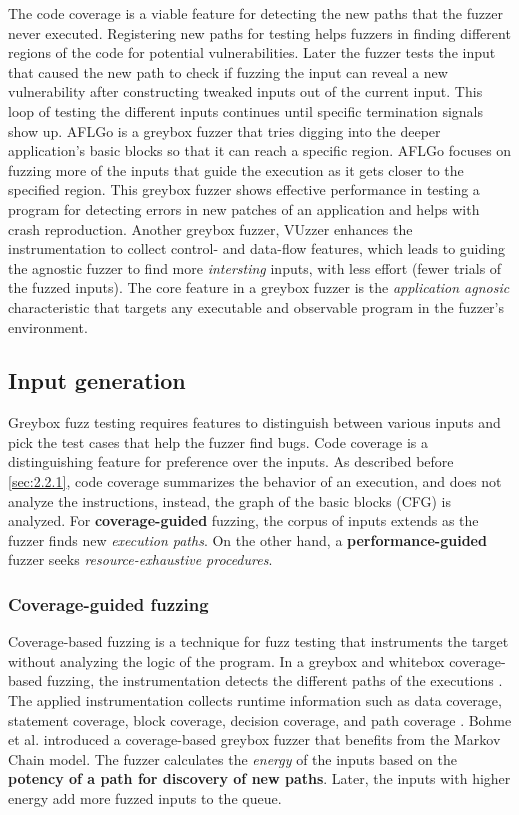 The code coverage is a viable feature for detecting the new paths that the fuzzer never executed. Registering new paths for testing helps fuzzers in finding different regions of the code for potential vulnerabilities. Later the fuzzer tests the input that caused the new path to check if fuzzing the input can reveal a new vulnerability after constructing tweaked inputs out of the current input. This loop of testing the different inputs continues until specific termination signals show up. AFLGo \cite{bohme2017directed} is a greybox fuzzer that tries digging into the deeper application's basic blocks so that it can reach a specific region. AFLGo focuses on fuzzing more of the inputs that guide the execution as it gets closer to the specified region. This greybox fuzzer shows effective performance in testing a program for detecting errors in new patches of an application and helps with crash reproduction. Another greybox fuzzer, VUzzer \cite{rawat2017vuzzer} enhances the instrumentation to collect control- and data-flow features, which leads to guiding the agnostic fuzzer to find more \textit{intersting} inputs, with less effort (fewer trials of the fuzzed inputs). The core feature in a greybox fuzzer is the \textit{application agnosic} characteristic that targets any executable and observable program in the fuzzer's environment.

\subsection{Input generation}

Greybox fuzz testing requires features to distinguish between various inputs and pick the test cases that help the fuzzer find bugs. Code coverage is a distinguishing feature for preference over the inputs. As described before \ref{sec:2.2.1}, code coverage summarizes the behavior of an execution, and does not analyze the instructions, instead, the graph of the basic blocks (CFG) is analyzed. For \textbf{coverage-guided} fuzzing, the corpus of inputs extends as the fuzzer finds new \textit{execution paths}. On the other hand, a \textbf{performance-guided} fuzzer seeks \textit{resource-exhaustive procedures}.

\subsubsection{Coverage-guided fuzzing}

Coverage-based fuzzing is a technique for fuzz testing that instruments the target without analyzing the logic of the program. In a greybox and whitebox coverage-based fuzzing, the instrumentation detects the different paths of the executions \cite{liang2018fuzzing}. The applied instrumentation collects runtime information such as data coverage, statement coverage, block coverage, decision coverage, and path coverage \cite{yang2009survey}. Bohme et al. \cite{bohme2017coverage} introduced a coverage-based greybox fuzzer that benefits from the Markov Chain model. The fuzzer calculates the \textit{energy} of the inputs based on the \textbf{potency of a path for discovery of new paths}. Later, the inputs with higher energy add more fuzzed inputs to the queue.

